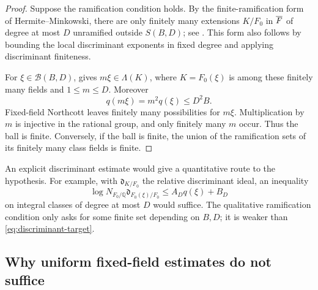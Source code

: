 \documentclass[11pt,a4paper]{article}
\newtheorem{theorem}{Theorem}[section]
\theoremstyle{definition}
\DeclareRobustCommand{\MathEqref}[1]{\begingroup\hypersetup{linkcolor=MathEquationLink}\eqref{#1}\endgroup}
\newcommand{\Q}{\mathbb Q}\newcommand{\R}{\mathbb R}\newcommand{\C}{\mathbb C}
\numberwithin{equation}{section}
\begin{document}

\begin{proof}
Suppose the ramification condition holds. By the finite-ramification
form of Hermite--Minkowski, there are only finitely many extensions
\(K/F_0\) in \(\overline F\) of degree at most \(D\) unramified
 outside \(S(B,D)\); see \cite[Theorem~10.2.2]{Kedlaya}.
This form also follows by bounding the local discriminant exponents
in fixed degree and applying discriminant finiteness.

For \(\xi\in\mathcal B(B,D)\),  gives
\(m\xi\in\Lambda(K)\), where \(K=F_0(\xi)\) is among these
finitely many fields and \(1\le m\le D\). Moreover
\[
 q(m\xi)=m^2q(\xi)\le D^2B.
\]
Fixed-field Northcott leaves finitely many possibilities for
\(m\xi\). Multiplication by \(m\) is injective in the rational
group, and only finitely many \(m\) occur. Thus the ball is finite.
Conversely, if the ball is finite, the union of the ramification
sets of its finitely many class fields is finite.
\end{proof}

An explicit discriminant estimate would give a quantitative route
to the hypothesis. For example, with \(\mathfrak d_{K/F_0}\)
the relative discriminant ideal, an inequality
\begin{equation}\label{eq:discriminant-target}
 \log N_{F_0/\Q}\mathfrak d_{F_0(\xi)/F_0}
       \le A_D q(\xi)+B_D
\end{equation}
on integral classes of degree at most \(D\) would suffice.
The qualitative ramification condition only asks for some finite
set depending on \(B,D\); it is weaker than
\MathEqref{eq:discriminant-target}.

\subsection{Why uniform fixed-field estimates do not suffice}
\label{sec:quadratic-example}
\end{document}
